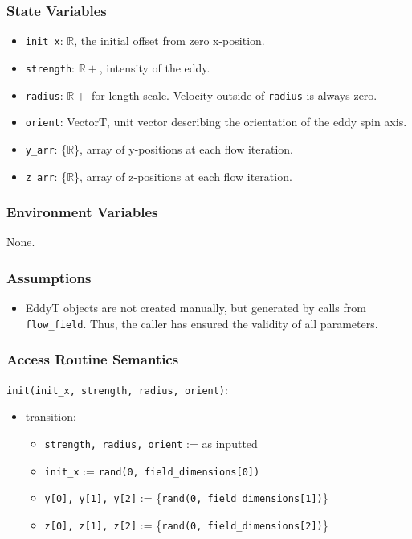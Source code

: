 \documentclass[12pt, titlepage]{article}
\begin{document}
\subsubsection{State Variables}
\begin{itemize}
  \item \texttt{init\_x}: $\mathbb{R}$, the initial offset from zero x-position.
  \item \texttt{strength}: $\mathbb{R+}$, intensity of the eddy.
  \item \texttt{radius}: $\mathbb{R+}$ for length scale. Velocity outside of \texttt{radius} is always zero.
  \item \texttt{orient}: VectorT, unit vector describing the orientation of the eddy spin axis.
  \item \texttt{y\_arr}: \{$\mathbb{R}$\}, array of y-positions at each flow iteration.
  \item \texttt{z\_arr}: \{$\mathbb{R}$\}, array of z-positions at each flow iteration.
\end{itemize}

\subsubsection{Environment Variables}
None.

\subsubsection{Assumptions}
\begin{itemize}
  \item EddyT objects are not created manually, but generated by calls from \texttt{flow\_field}. Thus, the caller has ensured the validity of all parameters.
\end{itemize}

\subsubsection{Access Routine Semantics}

\noindent \texttt{init(init\_x, strength, radius, orient)}:
\begin{itemize}
\item transition: 
  \begin{itemize}
  \item \texttt{strength, radius, orient} := as inputted
  \item \texttt{init\_x} := \texttt{rand(0, field\_dimensions[0])}
  \item \texttt{y[0], y[1], y[2]} := \{\texttt{rand(0, field\_dimensions[1])}\}
  \item \texttt{z[0], z[1], z[2]} := \{\texttt{rand(0, field\_dimensions[2])}\}
  \end{itemize}
\end{itemize}
\end{document}
